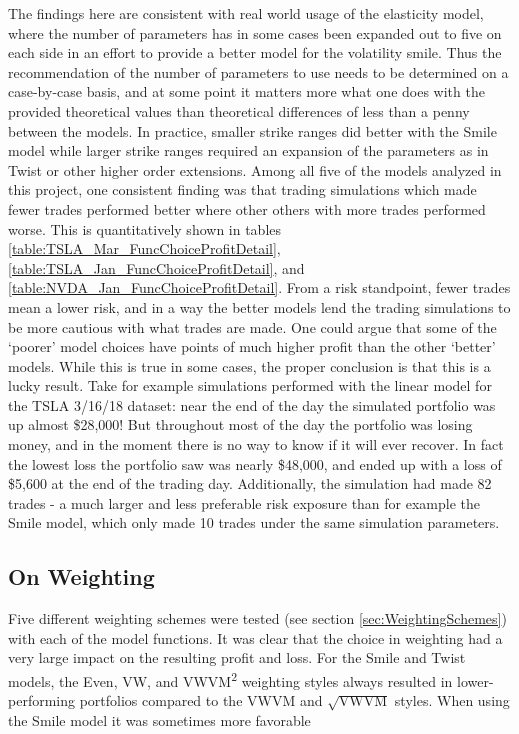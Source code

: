 \documentclass[12pt, a4paper, notitlepage]{article}
\numberwithin{equation}{subsection}
\numberwithin{figure}{subsection}
\numberwithin{table}{subsection}
\newcommand{\newpar}{\newline \newline}
\begin{document}
\newpar
The findings here are consistent with real world usage of the elasticity model, where the number of parameters has in some cases been expanded out to five on each side in an effort to provide a better model for the volatility smile.  Thus the recommendation of the number of parameters to use needs to be determined on a case-by-case basis, and at some point it matters more what one does with the provided theoretical values than theoretical differences of less than a penny between the models.  In practice, smaller strike ranges did better with the Smile model while larger strike ranges required an expansion of the parameters as in Twist or other higher order extensions.
\newpar
Among all five of the models analyzed in this project, one consistent finding was that trading simulations which made fewer trades performed better where other others with more trades performed worse.  This is quantitatively shown in tables \ref{table:TSLA_Mar_FuncChoiceProfitDetail}, \ref{table:TSLA_Jan_FuncChoiceProfitDetail}, and \ref{table:NVDA_Jan_FuncChoiceProfitDetail}.  From a risk standpoint, fewer trades mean a lower risk, and in a way the better models lend the trading simulations to be more cautious with what trades are made.
\newpar
One could argue that some of the `poorer' model choices have points of much higher profit than the other `better' models.  While this is true in some cases, the proper conclusion is that this is a lucky result.  Take for example simulations performed with the linear model for the TSLA 3/16/18 dataset: near the end of the day the simulated portfolio was up almost \$28,000!  But throughout most of the day the portfolio was losing money, and in the moment there is no way to know if it will ever recover.  In fact the lowest loss the portfolio saw was nearly \$48,000, and ended up with a loss of \$5,600 at the end of the trading day.  Additionally, the simulation had made 82 trades - a much larger and less preferable risk exposure than for example the Smile model, which only made 10 trades under the same simulation parameters.

\subsection{On Weighting}
Five different weighting schemes were tested (see section \ref{sec:WeightingSchemes}) with each of the model functions.  It was clear that the choice in weighting had a very large impact on the resulting profit and loss.  For the Smile and Twist models, the Even, VW, and VWVM\textsuperscript{2} weighting styles always resulted in lower-performing portfolios compared to the VWVM and $\sqrt{\text{VWVM}}$ styles.  When using the Smile model it was sometimes more favorable
\end{document}
